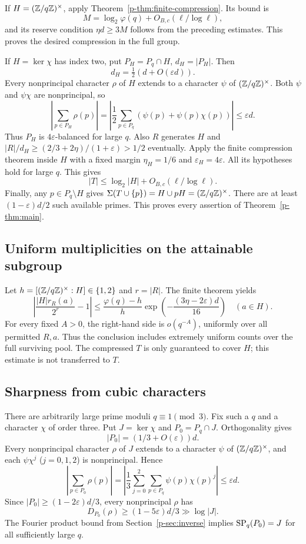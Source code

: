 \documentclass[11pt,a4paper]{article}
\theoremstyle{definition}
\theoremstyle{remark}
\begin{document}
If $H=(\mathbb Z/q\mathbb Z)^\times$, apply Theorem~\ref{p-thm:finite-compression}. Its bound is
\[
 M=\log_2\varphi(q)+O_{B,c}(\ell/\log\ell),
\]
and its reserve condition $\eta d\ge3M$ follows from the preceding
estimates. This proves the desired compression in the full group.

If $H=\ker\chi$ has index two, put $P_H=P_q\cap H$, $d_H=|P_H|$.
Then
\[
 d_H=\tfrac12(d+O(\varepsilon d)).
\]
Every nonprincipal character $\rho$ of $H$ extends to a character
$\psi$ of $(\mathbb Z/q\mathbb Z)^\times$. Both $\psi$ and $\psi\chi$ are nonprincipal, so
\[
 \left|\sum_{p\in P_H}\rho(p)\right|
 =\left|\frac12\sum_{p\in P_q}(\psi(p)+\psi(p)\chi(p))\right|
 \le\varepsilon d.
\]
Thus $P_H$ is $4\varepsilon$-balanced for large $q$. Also $R$ generates
$H$ and $|R|/d_H\ge(2/3+2\eta)/(1+\varepsilon)>1/2$ eventually.
Apply the finite compression theorem inside $H$ with a fixed margin
$\eta_H=1/6$ and $\varepsilon_H=4\varepsilon$. All its hypotheses
hold for large $q$. This gives
\[
 |T|\le\log_2|H|+O_{B,c}(\ell/\log\ell).
\]
Finally, any $p\in P_q\setminus H$ gives
$\Sigma(T\cup\{p\})=H\cup pH=(\mathbb Z/q\mathbb Z)^\times$. There are at least
$(1-\varepsilon)d/2$ such available primes. This proves every assertion
of Theorem~\ref{p-thm:main}.

\subsection{Uniform multiplicities on the attainable subgroup}
Let $h=[(\mathbb Z/q\mathbb Z)^\times:H]\in\{1,2\}$ and $r=|R|$. The finite theorem yields
\begin{equation}\label{p-eq:prime-counts}
 \left|\frac{|H|r_R(a)}{2^r}-1\right|
 \le\frac{\varphi(q)-h}{h}
 \exp\left(-\frac{(3\eta-2\varepsilon)d}{16}\right)
 \quad(a\in H).
\end{equation}
For every fixed $A>0$, the right-hand side is $o(q^{-A})$, uniformly
over all permitted $R,a$. Thus the conclusion includes extremely
uniform counts over the full surviving pool. The compressed $T$ is
only guaranteed to cover $H$; this estimate is not transferred to $T$.

\subsection{Sharpness from cubic characters}\label{p-sec:sharpness}
There are arbitrarily large prime moduli $q\equiv1\pmod3$. Fix such a
$q$ and a character $\chi$ of order three. Put $J=\ker\chi$ and
$P_0=P_q\cap J$. Orthogonality gives
\[
 |P_0|=(1/3+O(\varepsilon))d.
\]
Every nonprincipal character $\rho$ of $J$ extends to a character
$\psi$ of $(\mathbb Z/q\mathbb Z)^\times$, and each $\psi\chi^j$ ($j=0,1,2$) is
nonprincipal. Hence
\[
 \left|\sum_{p\in P_0}\rho(p)\right|
 =\left|\frac13\sum_{j=0}^2\sum_{p\in P_q}\psi(p)\chi(p)^j\right|
 \le\varepsilon d.
\]
Since $|P_0|\ge(1-2\varepsilon)d/3$, every nonprincipal $\rho$ has
\[
 D_{P_0}(\rho)\ge(1-5\varepsilon)d/3\gg\log|J|.
\]
The Fourier product bound from Section~\ref{p-sec:inverse} implies
$\operatorname{SP}_q(P_0)=J$ for all sufficiently large $q$.
\end{document}

